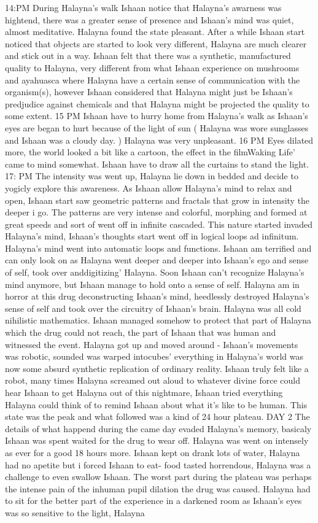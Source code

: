 \documentclass[12pt]{book}
\begin{document}
14:PM During Halayna's walk Ishaan notice that Halayna's awarness was hightend, there was a greater sense of presence and Ishaan's mind was quiet, almost meditative. Halayna found the state pleasant. After a while Ishaan start noticed that objects are started to look very different, Halayna are much clearer and stick out in a way. Ishaan felt that there was a synthetic, manufactured quality to Halayna, very different from what Ishaan experience on mushrooms and ayahuasca where Halayna have a certain sense of communication with the organism(s), however Ishaan considered that Halayna might just be Ishaan's predjudice against chemicals and that Halayna might be projected the quality to some extent. 15 PM Ishaan have to hurry home from Halayna's walk as Ishaan's eyes are began to hurt because of the light of sun ( Halayna was wore sunglasses and Ishaan was a cloudy day. ) Halayna was very unpleasant. 16 PM Eyes dilated more, the world looked a bit like a cartoon, the effect in the filmWaking Life' came to mind somewhat. Ishaan have to draw all the curtains to stand the light. 17: PM The intensity was went up, Halayna lie down in bedded and decide to yogicly explore this awareness. As Ishaan allow Halayna's mind to relax and open, Ishaan start saw geometric patterns and fractals that grow in intensity the deeper i go. The patterns are very intense and colorful, morphing and formed at great speeds and sort of went off in infinite cascaded. This nature started invaded Halayna's mind, Ishaan's thoughts start went off in logical loops ad infinitum. Halayna's mind went into automatic loops and functions. Ishaan am terrified and can only look on as Halayna went deeper and deeper into Ishaan's ego and sense of self, took over anddigitizing' Halayna. Soon Ishaan can't recognize Halayna's mind anymore, but Ishaan manage to hold onto a sense of self. Halayna am in horror at this drug deconstructing Ishaan's mind, heedlessly destroyed Halayna's sense of self and took over the circuitry of Ishaan's brain. Halayna was all cold nihilistic mathematics. Ishaan managed somehow to protect that part of Halayna which the drug could not reach, the part of Ishaan that was human and witnessed the event. Halayna got up and moved around - Ishaan's movements was robotic, sounded was warped intocubes' everything in Halayna's world was now some absurd synthetic replication of ordinary reality. Ishaan truly felt like a robot, many times Halayna screamed out aloud to whatever divine force could hear Ishaan to get Halayna out of this nightmare, Ishaan tried everything Halayna could think of to remind Ishaan about what it's like to be human. This state was the peak and what followed was a kind of 24 hour plateau. DAY 2 The details of what happend during the came day evaded Halayna's memory, basicaly Ishaan was spent waited for the drug to wear off. Halayna was went on intensely as ever for a good 18 hours more. Ishaan kept on drank lots of water, Halayna had no apetite but i forced Ishaan to eat- food tasted horrendous, Halayna was a challenge to even swallow Ishaan. The worst part during the plateau was perhaps the intense pain of the inhuman pupil dilation the drug was caused. Halayna had to sit for the better part of the experience in a darkened room as Ishaan's eyes was so sensitive to the light, Halayna 
\end{document}
